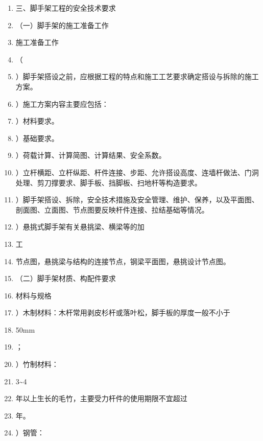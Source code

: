 \documentclass[UTF8,fontset=fandol,11pt]{ctexart}
\begin{document}
\begin{enumerate}[label=\arabic*.]

\item 三、脚手架工程的安全技术要求

\item （一）脚手架的施工准备工作

\item 施工准备工作

\item （

\item ）脚手架搭设之前，应根据工程的特点和施工工艺要求确定搭设与拆除的施工方案。

\item ）施工方案内容主要应包括：

\item ）材料要求。

\item ）基础要求。

\item ）荷载计算、计算简图、计算结果、安全系数。

\item ）立杆横距、立杆纵距、杆件连接、步距、允许搭设高度、连墙杆做法、门洞处理、剪刀撑要求、脚手板、挡脚板、扫地杆等构造要求。

\item ）脚手架搭设、拆除，安全技术措施及安全管理、维护、保养，以及平面图、剖面图、立面图、节点图要反映杆件连接、拉结基础等情况。

\item ）悬挑式脚手架有关悬挑梁、横梁等的加

\item 工

\item 节点图，悬挑梁与结构的连接节点，钢梁平面图，悬挑设计节点图。

\item （二）脚手架材质、构配件要求

\item 材料与规格

\item ）木制材料：木杆常用剥皮杉杆或落叶松，脚手板的厚度一般不小于

\item 50mm

\item ；

\item ）竹制材料：

\item 3\textasciitilde{}4

\item 年以上生长的毛竹，主要受力杆件的使用期限不宜超过

\item 年。

\item ）钢管：

\end{enumerate}
\end{document}
